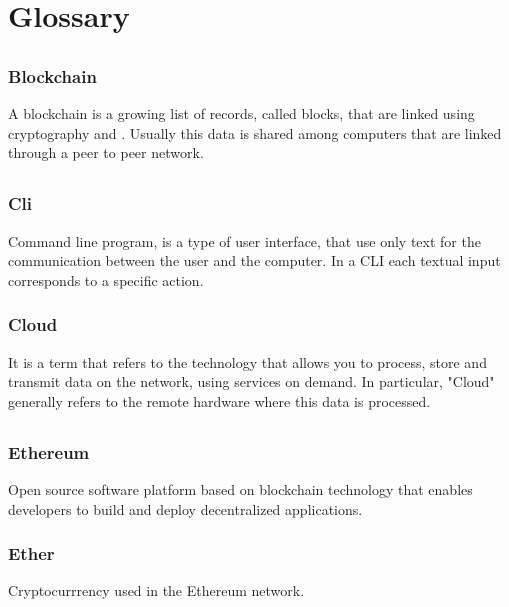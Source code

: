 \section{Glossary}

	\subsection*{}
		\subsubsection*{Blockchain}
			A blockchain is a growing list of records, called blocks, that are linked using cryptography and . Usually this data is shared among computers that are linked through a peer to peer network. 

	\subsection*{}
		\subsubsection*{Cli}
			Command line program, is a type of user interface, that use only text for the communication between the user and the computer. In a CLI each textual input corresponds to a specific action.		
		
		\subsubsection*{Cloud}
			It is a term that refers to the technology that allows you to process, store and transmit data on the network, using services on demand. In particular, "Cloud" generally refers to the remote hardware where this data is processed.

	\subsection*{}
		\subsubsection*{Ethereum}
			Open source software platform based on blockchain technology that enables developers to build and deploy decentralized applications. 
			
		\subsubsection*{Ether}
			Cryptocurrrency used in the Ethereum network. 
	

